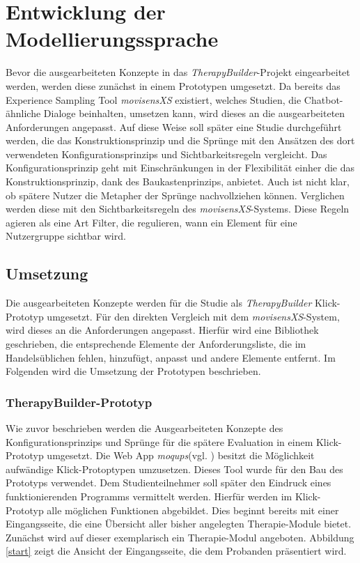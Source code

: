 \chapter{Entwicklung der Modellierungssprache}
\label{ch:Implementation}
Bevor die ausgearbeiteten Konzepte in das \emph{TherapyBuilder}-Projekt eingearbeitet werden, werden diese zunächst in einem Prototypen umgesetzt. Da bereits das Experience Sampling Tool \emph{movisensXS} existiert, welches Studien, die Chatbot-ähnliche Dialoge beinhalten, umsetzen kann, wird dieses an die ausgearbeiteten Anforderungen angepasst. Auf diese Weise soll später eine Studie durchgeführt werden, die das Konstruktionsprinzip und die Sprünge mit den Ansätzen des dort verwendeten Konfigurationsprinzips und Sichtbarkeitsregeln vergleicht. Das Konfigurationsprinzip geht mit Einschränkungen in der Flexibilität einher die das Konstruktionsprinzip, dank des Baukastenprinzips, anbietet. Auch ist nicht klar, ob spätere Nutzer die Metapher der Sprünge nachvollziehen können. Verglichen werden diese mit den Sichtbarkeitsregeln des \emph{movisensXS}-Systems. Diese Regeln agieren als eine Art Filter, die regulieren, wann ein Element für eine Nutzergruppe sichtbar wird. 

\section{Umsetzung}
Die ausgearbeiteten Konzepte werden für die Studie als \emph{TherapyBuilder} Klick-Prototyp umgesetzt. Für den direkten Vergleich mit dem \emph{movisensXS}-System, wird dieses an die Anforderungen angepasst. Hierfür wird eine Bibliothek geschrieben, die entsprechende Elemente der Anforderungsliste, die im Handelsüblichen fehlen, hinzufügt, anpasst und andere Elemente entfernt. Im Folgenden wird die Umsetzung der Prototypen beschrieben.

\subsection{TherapyBuilder-Prototyp}
Wie zuvor beschrieben werden die Ausgearbeiteten Konzepte des Konfigurationsprinzips und Sprünge für die spätere Evaluation in einem Klick-Prototyp umgesetzt. Die Web App \emph{moqups}(vgl. \cite{OnlineMo52:online}) besitzt die Möglichkeit aufwändige Klick-Protoptypen umzusetzen. Dieses Tool wurde für den Bau des Prototyps verwendet. Dem Studienteilnehmer soll später den Eindruck eines funktionierenden Programms vermittelt werden. Hierfür werden im Klick-Prototyp alle möglichen Funktionen abgebildet. Dies beginnt bereits mit einer Eingangsseite, die eine Übersicht aller bisher angelegten Therapie-Module bietet. Zunächst wird auf dieser exemplarisch ein Therapie-Modul angeboten. Abbildung \ref{start} zeigt die Ansicht der Eingangsseite, die dem Probanden präsentiert wird. 

